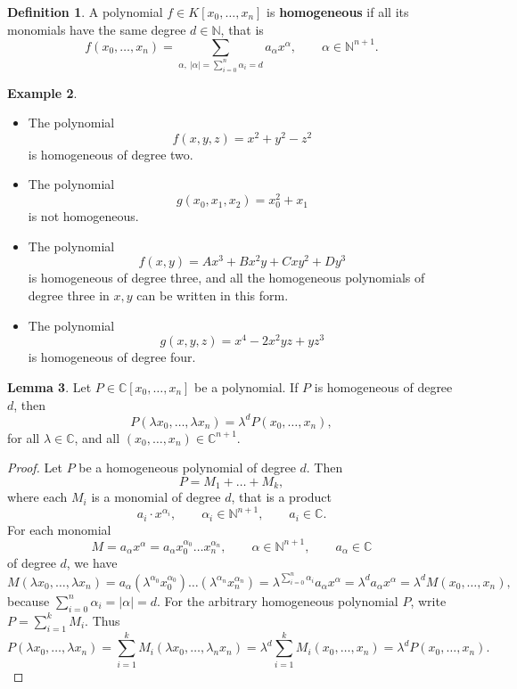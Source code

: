 \documentclass{article}
\newcommand{\N}{\mathbb{N}}
\newcommand{\C}{\mathbb{C}}
\newcommand{\rb}[1]{\left( #1 \right)}
\renewcommand{\sb}[1]{\left[ #1 \right]}
\newcommand{\abs}[1]{\left\lvert #1 \right\rvert}
\theoremstyle{definition}\newtheorem{definition}{Definition}[section]
\theoremstyle{definition}\newtheorem{notation}[definition]{Notation}
\theoremstyle{definition}\newtheorem{remark}[definition]{Remark}
\theoremstyle{definition}\newtheorem{example1}[definition]{Example}
\theoremstyle{definition}\newtheorem{fact}{Fact}
\theoremstyle{definition}\newtheorem{exercise}{Exercise}
\theoremstyle{definition}\newtheorem*{example2}{Example}
\newtheorem{lemma}[definition]{Lemma}
\begin{document}
\begin{definition}
A polynomial $ f \in K\sb{x_0, \dots, x_n} $ is \textbf{homogeneous} if all its monomials have the same degree $ d \in \N $, that is
$$ f\rb{x_0, \dots, x_n} = \sum_{\alpha, \ \abs{\alpha} = \sum_{i = 0}^n \alpha_i = d} a_\alpha x^\alpha, \qquad \alpha \in \N^{n + 1}. $$
\end{definition}

\begin{example1}
\hfill
\begin{itemize}
\item The polynomial
$$ f\rb{x, y, z} = x^2 + y^2 - z^2 $$
is homogeneous of degree two.
\item The polynomial
$$ g\rb{x_0, x_1, x_2} = x_0^2 + x_1 $$
is not homogeneous.
\item The polynomial
$$ f\rb{x, y} = Ax^3 + Bx^2y + Cxy^2 + Dy^3 $$
is homogeneous of degree three, and all the homogeneous polynomials of degree three in $ x, y $ can be written in this form.
\item The polynomial
$$ g\rb{x, y, z} = x^4 - 2x^2yz + yz^3 $$
is homogeneous of degree four.
\end{itemize}
\end{example1}

\begin{lemma}
\label{lem:4.4}
Let $ P \in \C\sb{x_0, \dots, x_n} $ be a polynomial. If $ P $ is homogeneous of degree $ d $, then
$$ P\rb{\lambda x_0, \dots, \lambda x_n} = \lambda^dP\rb{x_0, \dots, x_n}, $$ for all $ \lambda \in \C $, and all $ \rb{x_0, \dots, x_n} \in \C^{n + 1} $.
\end{lemma}

\begin{proof}
Let $ P $ be a homogeneous polynomial of degree $ d $. Then
$$ P = M_1 + \dots + M_k, $$
where each $ M_i $ is a monomial of degree $ d $, that is a product
$$ a_i \cdot x^{\alpha_i}, \qquad \alpha_i \in \N^{n + 1}, \qquad a_i \in \C. $$
For each monomial
$$ M = a_\alpha x^\alpha = a_\alpha x_0^{\alpha_0} \dots x_n^{\alpha_n}, \qquad \alpha \in \N^{n + 1}, \qquad a_\alpha \in \C $$
of degree $ d $, we have
$$ M\rb{\lambda x_0, \dots, \lambda x_n} = a_\alpha\rb{\lambda^{\alpha_0}x_0^{\alpha_0}} \dots \rb{\lambda^{\alpha_n}x_n^{\alpha_n}} = \lambda^{\sum_{i = 0}^n \alpha_i}a_\alpha x^\alpha = \lambda^da_\alpha x^\alpha = \lambda^dM\rb{x_0, \dots, x_n}, $$
because $ \sum_{i = 0}^n \alpha_i = \abs{\alpha} = d $. For the arbitrary homogeneous polynomial $ P $, write $ P = \sum_{i = 1}^k M_i $. Thus
$$ P\rb{\lambda x_0, \dots, \lambda x_n} = \sum_{i = 1}^k M_i\rb{\lambda x_0, \dots, \lambda_n x_n} = \lambda^d\sum_{i = 1}^k M_i\rb{x_0, \dots, x_n} = \lambda^dP\rb{x_0, \dots, x_n}. $$
\end{proof}
\end{document}
